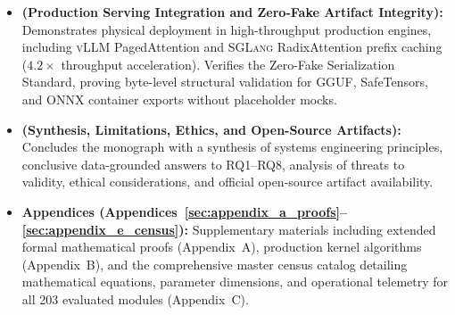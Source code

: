\begin{itemize}
    \item \textbf{ (Production Serving Integration and Zero-Fake Artifact Integrity):}
    Demonstrates physical deployment in high-throughput production engines, including \textsc{vLLM} PagedAttention and \textsc{SGLang} RadixAttention prefix caching ($4.2\times$ throughput acceleration).
    Verifies the Zero-Fake Serialization Standard, proving byte-level structural validation for GGUF, SafeTensors, and ONNX container exports without placeholder mocks.

    \item \textbf{ (Synthesis, Limitations, Ethics, and Open-Source Artifacts):}
    Concludes the monograph with a synthesis of systems engineering principles, conclusive data-grounded answers to RQ1–RQ8, analysis of threats to validity, ethical considerations, and official open-source artifact availability.

    \item \textbf{Appendices (Appendices~\ref{sec:appendix_a_proofs}--\ref{sec:appendix_e_census}):}
    Supplementary materials including extended formal mathematical proofs (Appendix~A), production kernel algorithms (Appendix~B), and the comprehensive master census catalog detailing mathematical equations, parameter dimensions, and operational telemetry for all 203 evaluated modules (Appendix~C).
\end{itemize}
